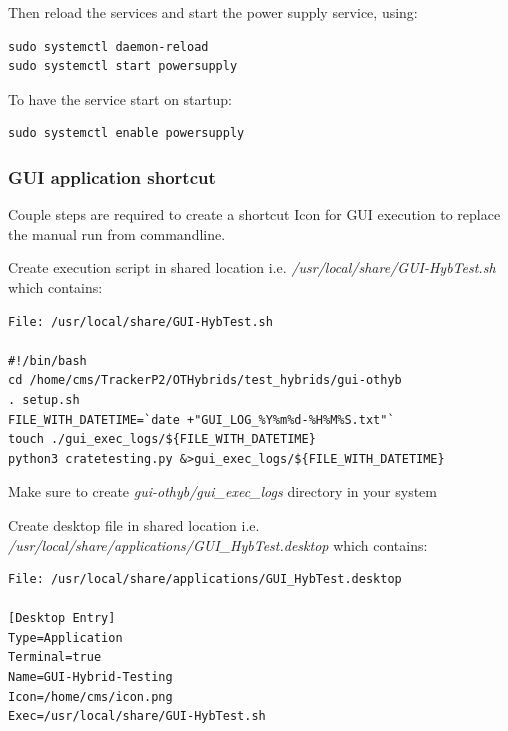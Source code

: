 \documentclass[10pt,a4paper]{article}
\begin{document}
Then reload the services and start the power supply service, using:

\begin{framed}
\begin{verbatim}
sudo systemctl daemon-reload
sudo systemctl start powersupply
\end{verbatim}
\end{framed}

To have the service start on startup:

\begin{framed}
\begin{verbatim}
sudo systemctl enable powersupply
\end{verbatim}
\end{framed}

\subsubsection{GUI application shortcut}
\label{GUI-short}

Couple steps are required to create a shortcut Icon for GUI execution to replace the manual run from commandline.

Create execution script in shared location i.e. \emph{/usr/local/share/GUI-HybTest.sh} which contains:

\begin{framed}
\begin{verbatim}
File: /usr/local/share/GUI-HybTest.sh

#!/bin/bash
cd /home/cms/TrackerP2/OTHybrids/test_hybrids/gui-othyb
. setup.sh
FILE_WITH_DATETIME=`date +"GUI_LOG_%Y%m%d-%H%M%S.txt"`
touch ./gui_exec_logs/${FILE_WITH_DATETIME}
python3 cratetesting.py &>gui_exec_logs/${FILE_WITH_DATETIME}

\end{verbatim}
\end{framed}

Make sure to create \emph{gui-othyb/gui\_exec\_logs} directory in your system

Create desktop file in shared location i.e. \emph{/usr/local/share/applications/GUI\_HybTest.desktop} which contains:

\begin{framed}
\begin{verbatim}
File: /usr/local/share/applications/GUI_HybTest.desktop

[Desktop Entry]
Type=Application
Terminal=true
Name=GUI-Hybrid-Testing
Icon=/home/cms/icon.png
Exec=/usr/local/share/GUI-HybTest.sh

\end{verbatim}
\end{framed}
\end{document}
